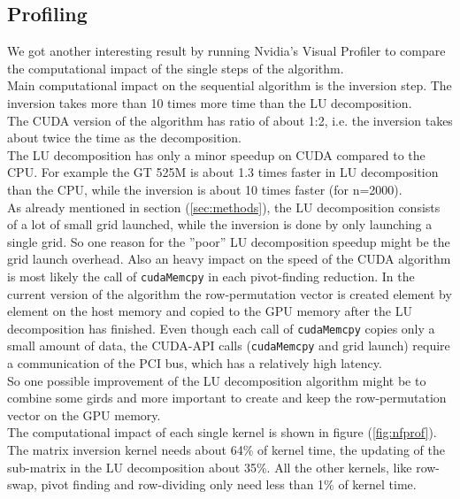\subsection*{Profiling}
We got another interesting result by running Nvidia's Visual Profiler to compare the computational impact of the single steps of the algorithm.
\vspace{0.2cm}\\
Main computational impact on the sequential algorithm is the inversion step. The inversion takes more than 10 times more time than the LU decomposition.\\
The CUDA version of the algorithm has ratio of about 1:2, i.e. the inversion takes about twice the time as the decomposition. \\ 
The LU decomposition has only a minor speedup on CUDA compared to the CPU. For example the GT 525M is about 1.3 times faster in LU decomposition than the CPU, while the inversion is about 10 times faster (for n=2000).\\
As already mentioned in section (\ref{sec:methods}), the LU decomposition consists of a lot of small grid launched, while the inversion is done by only launching a single grid. 
So one reason for the ''poor'' LU decomposition speedup might be the grid launch overhead. Also an heavy  impact on the speed of the CUDA algorithm is most likely the call of \texttt{cudaMemcpy} in each pivot-finding reduction. In the current version of the algorithm the row-permutation vector is created element by element on the host memory and copied to the GPU memory after the LU decomposition has finished. Even though each call of \texttt{cudaMemcpy} copies only a small amount of data, the CUDA-API calls (\texttt{cudaMemcpy} and grid launch) require a communication of the PCI bus, which has a relatively high latency.
\vspace{0.2cm}\\
So one possible improvement of the LU decomposition algorithm might be to combine some girds and more important to create and keep the row-permutation vector on the GPU memory.
\vspace{0.3cm}\\
The computational impact of each single kernel is shown in figure (\ref{fig:nfprof}). The matrix inversion kernel needs about 64\% of kernel time, the updating of the sub-matrix in the LU decomposition about 35\%. All the other kernels, like row-swap, pivot finding and row-dividing only need less than 1\% of kernel time. 
